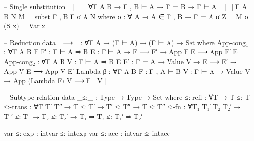 \documentclass{article}
\begin{document}
\begin{code}
-- Single substitution
_[_] : ∀{Γ A B}  →  Γ , B ⊢ A  →  Γ ⊢ B  →  Γ ⊢ A
_[_] {Γ} {A} {B} N M = subst {Γ , B} {Γ} σ {A} N
    where
    σ : ∀ {A}  →  A ∈ Γ , B  →  Γ ⊢ A
    σ Z = M
    σ (S x) = Var x

-- Reduction
data _⟶_ : ∀{Γ A}  →  (Γ ⊢ A)  →  (Γ ⊢ A)  →  Set where
    App-cong₁ : ∀{Γ A B} {F F′ : Γ ⊢ A ⇒ B} {E : Γ ⊢ A}  →  F ⟶ F′  →  App F E ⟶ App F′ E
    App-cong₂ : ∀{Γ A B} {V : Γ ⊢ A ⇒ B} {E E′ : Γ ⊢ A}  →  Value V  →  E ⟶ E′  →  App V E ⟶ App V E′
    Lambda-β : ∀{Γ A B} {F : Γ , A ⊢ B} {V : Γ ⊢ A}  →  Value V  →  App (Lambda F) V ⟶ F [ V ]

-- Subtype relation
data _≤:_ : Type  →  Type  →  Set where
    ≤:-refl : ∀{T}  →  T ≤: T
    ≤:-trans : ∀{T T′ T″}  →  T ≤: T′  →  T′ ≤: T″  →  T ≤: T″
    ≤:-fn : ∀{T₁ T₁′ T₂ T₂′}  →  T₁′ ≤: T₁  →  T₂ ≤: T₂′  →  T₁ ⇒ T₂ ≤: T₁′ ⇒ T₂′

    var-≤:-exp : intvar ≤: intexp
    var-≤:-acc : intvar ≤: intacc
\end{code}
\end{document}
